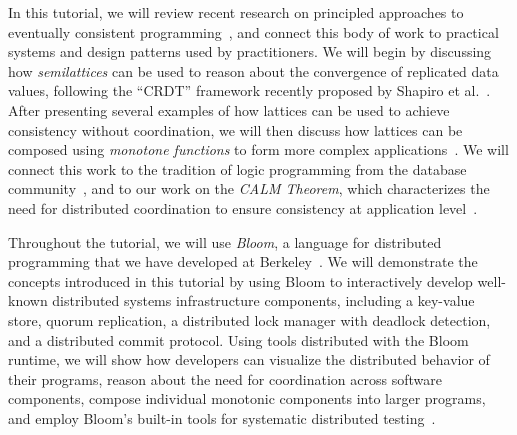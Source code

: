 In this tutorial, we will review recent research on principled approaches to
eventually consistent
programming~\cite{Alvaro2011,Burckhardt2012,Conway2012,Hellerstein2010,Roh2011,Shapiro2011a,Shapiro2011b},
and connect this body of work to practical systems and design patterns used by
practitioners. We will begin by discussing how \emph{semilattices} can be used to
reason about the convergence of replicated data values, following the ``CRDT''
framework recently proposed by Shapiro et
al.~\cite{Shapiro2011a,Shapiro2011b}. After presenting several examples of how
lattices can be used to achieve consistency without coordination, we will then
discuss how lattices can be composed using \emph{monotone functions} to form
more complex applications~\cite{Conway2012}. We will connect this work to the tradition of logic programming from the database community~\cite{AliceBook}, and to our work on the
\emph{CALM Theorem}, which characterizes the need for distributed coordination to 
ensure consistency at application level~\cite{Alvaro2011,Ameloot2011,Hellerstein2010,dedalus-confluence}. 

\begin{comment}
Finally,
we will discuss several design options for supporting non-monotonic operations:
\begin{compactenum}[(a)]
\item introducing coordination at appropriate program locations identified by
  CALM analysis
\item employing ``weak coordination'' as a background operation (e.g., for distributed
garbage collection)
\item tolerating and then correcting inconsistency using taint tracking and
after-the-fact ``apology'' or compensation logic~\cite{Garcia-Molina1987,Helland2009,Korth1990}
\end{compactenum}
We will conclude by summarizing the state of the art and highlighting open
problems and challenges in the field.
\end{comment}

Throughout the tutorial, we will use \emph{Bloom}, a language for distributed
programming that we have developed at Berkeley~\cite{bloom-website}. We will
demonstrate the concepts introduced in this tutorial by using Bloom to interactively 
develop well-known distributed systems infrastructure components, including a key-value
store, quorum replication, a distributed lock manager with deadlock detection,
and a distributed commit protocol. Using tools distributed with the Bloom
runtime, we will show how developers can visualize the distributed behavior of
their programs, reason about the need for coordination across software components, compose
individual monotonic components into larger programs, and employ Bloom's
built-in tools for systematic distributed testing~\cite{Alvaro2012}.


